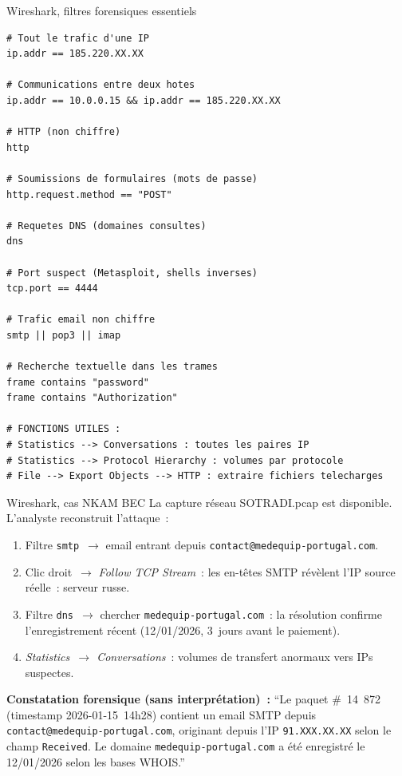 \begin{boxoutils}{Wireshark, filtres forensiques essentiels}
\begin{lstlisting}[language=bash_forensique]
# Tout le trafic d'une IP
ip.addr == 185.220.XX.XX

# Communications entre deux hotes
ip.addr == 10.0.0.15 && ip.addr == 185.220.XX.XX

# HTTP (non chiffre)
http

# Soumissions de formulaires (mots de passe)
http.request.method == "POST"

# Requetes DNS (domaines consultes)
dns

# Port suspect (Metasploit, shells inverses)
tcp.port == 4444

# Trafic email non chiffre
smtp || pop3 || imap

# Recherche textuelle dans les trames
frame contains "password"
frame contains "Authorization"

# FONCTIONS UTILES :
# Statistics --> Conversations : toutes les paires IP
# Statistics --> Protocol Hierarchy : volumes par protocole
# File --> Export Objects --> HTTP : extraire fichiers telecharges
\end{lstlisting}
\end{boxoutils}

\begin{boxscenario}{Wireshark, cas NKAM BEC}
La capture réseau SOTRADI.pcap est disponible. L'analyste reconstruit
l'attaque~:
\begin{enumerate}
    \item Filtre \texttt{smtp}~$\to$ email entrant depuis
          \texttt{contact@medequip-portugal.com}.
    \item Clic droit~$\to$ \textit{Follow TCP Stream}~: les en-têtes
          SMTP révèlent l'IP source réelle~: serveur russe.
    \item Filtre \texttt{dns}~$\to$ chercher \texttt{medequip-portugal.com}~:
          la résolution confirme l'enregistrement récent (12/01/2026,
          3~jours avant le paiement).
    \item \textit{Statistics~$\to$ Conversations}~: volumes de transfert
          anormaux vers IPs suspectes.
\end{enumerate}

\textbf{Constatation forensique (sans interprétation)~:} ``Le paquet
\#~14~872 (timestamp 2026-01-15~14h28) contient un email SMTP depuis
\texttt{contact@medequip-portugal.com}, originant depuis l'IP
\texttt{91.XXX.XX.XX} selon le champ \texttt{Received}. Le domaine
\texttt{medequip-portugal.com} a été enregistré le 12/01/2026 selon
les bases WHOIS.''
\end{boxscenario}

